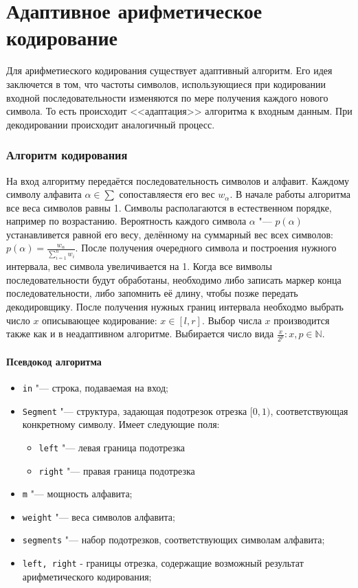 \documentclass[12pt]{article}
\author{\copyright~~@mikhirurg}
\date{17 nov 2019}
\begin{document}
\pagestyle{fancy}
\part*{Адаптивное арифметическое кодирование}
Для арифметиеского кодирования существует адаптивный алгоритм. Его идея заключется в том, что частоты символов, использующиеся при кодировании входной последовательности изменяются по мере получения каждого нового символа. То есть происходит <<адаптация>> алгоритма к входным данным. При декодировании происходит аналогичный процесс.
\section*{Алгоритм кодирования}
На вход алгоритму передаётся последовательность символов и алфавит. Каждому символу алфавита $\alpha \in \sum $
сопоставляестя его вес 
$ w_\alpha $. В начале работы алгоритма все веса символов равны 1.
Символы располагаются в естественном порядке, например по возрастанию. Вероятность каждого символа $ \alpha $ "--- $ p(\alpha) $ устанавливется равной его весу, делённому на суммарный вес всех символов: $ p(\alpha) = \frac{w_\alpha}{\sum_{i=1}^n w_i} $. После получения очередного символа и построения нужного интервала, вес символа увеличивается на 1. Когда все вимволы последовательности будут обработаны, необходимо либо записать маркер конца последовательности, либо запомнить её длину, чтобы позже передать декодировщику. После получения нужных границ интервала необходмо выбрать число $ x $ описывающее кодирование:
$ x \in [l, r]$. Выбор числа $x$ производится также как и в неадаптивном алгоритме. Выбирается число вида $ \frac{x}{2^p}: x,p \in \mathbb N$.

\subsection*{Псевдокод алгоритма}

\begin{itemize}
	\item \verb'in' "--- строка, подаваемая на вход;
	\item \verb'Segment' "--- структура, задающая подотрезок отрезка $[0, 1)$, соответствующая конкретному символу.
   Имеет следующие поля:
   \begin{itemize}
		\item \verb'left' "--- левая граница подотрезка
		\item \verb'right' "--- правая граница подотрезка
	\end{itemize}
	\item \verb'm' "--- мощность алфавита;
   \item \verb'weight' "--- веса символов алфавита;
	\item \verb'segments' "--- набор подотрезков, соответствующих символам алфавита;
	\item \verb'left, right' - границы отрезка, содержащие возможный результат арифметического кодирования;
\end{itemize}
\end{document}
